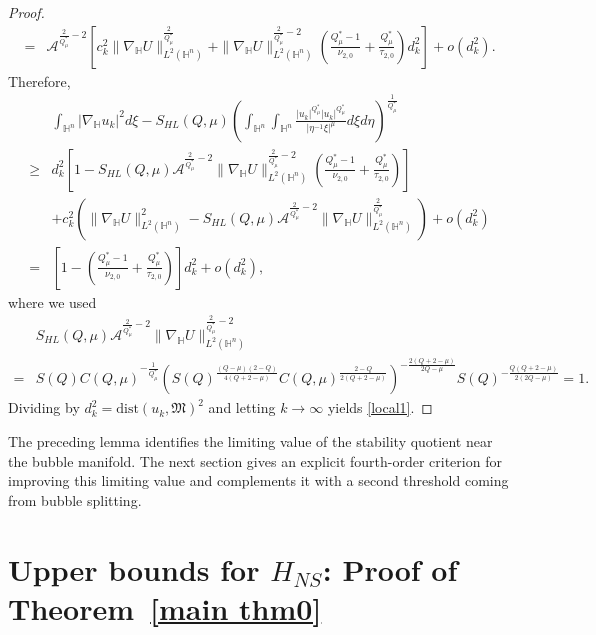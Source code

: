 \documentclass[11pt]{article}
\begin{document}
\begin{proof}
\begin{align*}
=& \mathcal{A}^{\frac{2}{Q^{\ast}_{\mu}}-2}
\left[c_k^{2} \|\nabla_\mathbb{H}U\|^{\frac{2}{Q^{\ast}_{\mu}}}_{L^{2}(\mathbb{H}^{n})}+\|\nabla_\mathbb{H}U\|^{\frac{2}{Q^{\ast}_{\mu}}-2}_{L^{2}(\mathbb{H}^{n})}
\left(\frac{Q^{\ast}_{\mu}-1}{\nu_{2,0}}+\frac{Q^{\ast}_{\mu}}{\tau_{2,0}}\right)d_k^2\right]+o(d_k^2).
 \end{align*}
{Therefore,}
 \begin{align*}
 & \int_{\mathbb{H}^{n}}|\nabla_{\mathbb{H}} u_k|^{2}{d}\xi-S_{HL}(Q,\mu) \left(\int_{\mathbb{H}^{n}}\int_{\mathbb{H}^{n}}\frac{|u_k|^{Q^{\ast}_{\mu}}|u_k|
^{Q^{\ast}_{\mu}}}{|\eta^{-1}\xi|^{\mu}}{d}\xi{d}\eta\right)^{\frac{1}{Q^{\ast}_{\mu}}}\\
\geq&
d_k^2\left[1-S_{HL}(Q,\mu)
\mathcal{A}^{\frac{2}{Q^{\ast}_{\mu}}-2} \|\nabla_\mathbb{H}U\|^{\frac{2}{Q^{\ast}_{\mu}}-2}_{L^{2}(\mathbb{H}^{n})}\left(\frac{Q^{\ast}_{\mu}-1}{\nu_{2,0}}+\frac{Q^{\ast}_{\mu}}{\tau_{2,0}}\right)\right]\\
&+c_k^2\left(\|\nabla_\mathbb{H}U\|^2_{{L}^{2}(\mathbb{H}^n)}-S_{HL}(Q,\mu)
\mathcal{A}^{\frac{2}{Q^{\ast}_{\mu}}-2} \|\nabla_\mathbb{H}U\|^{\frac{2}{Q^{\ast}_{\mu}}}_{L^{2}(\mathbb{H}^{n})}\right)+o(d_k^2)
\\
=&\left[1-\left(\frac{Q^{\ast}_{\mu}-1}{\nu_{2,0}}+\frac{Q^{\ast}_{\mu}}{\tau_{2,0}}\right)\right]d_k^2+o(d_k^2),
 \end{align*}
{where we used}
 \begin{align*}
 &S_{HL}(Q,\mu)\mathcal{A}^{\frac{2}{Q^{\ast}_{\mu}}-2} \|\nabla_\mathbb{H}U\|^{\frac{2}{Q^{\ast}_{\mu}}-2}_{L^{2}(\mathbb{H}^{n})}\\
 =&S(Q)C(Q,\mu)^{-\frac{1}{Q^{\ast}_{\mu}}}
 \left(S(Q)^{\frac{(Q-\mu)(2-Q)}{4(Q+2-\mu)}}C(Q,\mu)^{\frac{2-Q}{2(Q+2-\mu)}}\right)^{-\frac{2(Q+2-\mu)}{2Q-\mu}}
 S(Q)^{-\frac{Q(Q+2-\mu)}{2(2Q-\mu)}}=1.
 \end{align*}
{Dividing by $d_k^2=\mathrm{dist}(u_k,\mathfrak M)^2$ and letting $k\to\infty$ yields \eqref{local1}.}
\end{proof}



The preceding lemma identifies the limiting value of the stability quotient near the bubble manifold. The next section gives an explicit fourth-order criterion for improving this limiting value and complements it with a second threshold coming from bubble splitting.

\section{\texorpdfstring{{Upper bounds for $H_{NS}$: Proof of Theorem~\ref{main thm0}}}{Upper bounds for HNS: Proof of Theorem 3.1}}\label{sec4}
\end{document}
